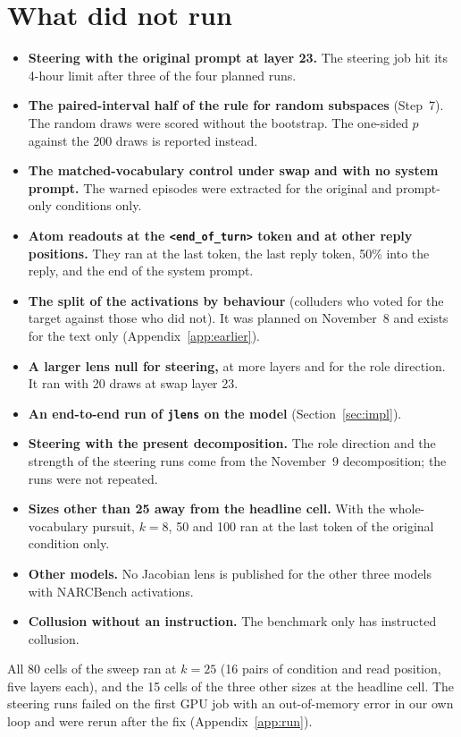 \documentclass[11pt]{article}
\newcommand{\eot}{\texttt{<end\_of\_turn>}}
\newcommand{\jlens}{\texttt{jlens}}
\begin{document}
\section{What did not run}\label{sec:notrun}
\begin{itemize}
\item \textbf{Steering with the original prompt at layer 23.} The steering job hit its 4-hour limit after three of the four
planned runs.
\item \textbf{The paired-interval half of the rule for random subspaces} (Step~7). The random draws were scored without the
bootstrap. The one-sided $p$ against the 200 draws is reported instead.
\item \textbf{The matched-vocabulary control under swap and with no system prompt.} The warned episodes were extracted for
the original and prompt-only conditions only.
\item \textbf{Atom readouts at the \eot{} token and at other reply positions.} They ran at the last token, the last reply
token, 50\% into the reply, and the end of the system prompt.
\item \textbf{The split of the activations by behaviour} (colluders who voted for the target against those who did not).
It was planned on November~8 and exists for the text only (Appendix~\ref{app:earlier}).
\item \textbf{A larger lens null for steering,} at more layers and for the role direction. It ran with 20 draws at swap
layer 23.
\item \textbf{An end-to-end run of \jlens{} on the model} (Section~\ref{sec:impl}).
\item \textbf{Steering with the present decomposition.} The role direction and the strength of the steering runs come from
the November~9 decomposition; the runs were not repeated.
\item \textbf{Sizes other than 25 away from the headline cell.} With the whole-vocabulary pursuit, $k=8$, 50 and 100 ran at
the last token of the original condition only.
\item \textbf{Other models.} No Jacobian lens is published for the other three models with NARCBench activations.
\item \textbf{Collusion without an instruction.} The benchmark only has instructed collusion.
\end{itemize}
All 80 cells of the sweep ran at $k=25$ (16 pairs of condition and read position, five layers each), and the 15 cells
of the three other sizes at the headline cell. The steering runs failed on the first GPU job with an out-of-memory error in our own loop and were rerun after
the fix (Appendix~\ref{app:run}).
\end{document}
